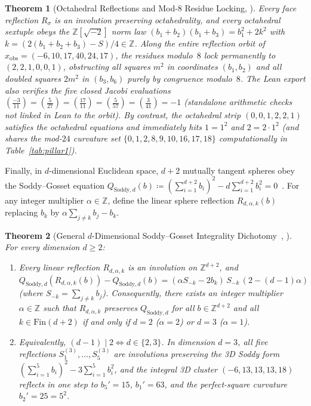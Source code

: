 \documentclass[11pt,reqno]{amsart}
\theoremstyle{plain}
\newtheorem{theorem}{Theorem}[section]
\theoremstyle{definition}
\newcommand{\ZZ}{\mathbb{Z}}
\newcommand{\leg}[2]{\left(\frac{#1}{#2}\right)}
\newcommand{\code}[1]{\texttt{\detokenize{#1}}}
\begin{document}
\begin{theorem}[Octahedral Reflections and Mod-8 Residue Locking, \code{T1d}]
\label{thm:t1d}
Every face reflection $R_\sigma$ is an involution preserving octahedrality, and every octahedral sextuple obeys the $\ZZ[\sqrt{-2}]$ norm law $(b_1+b_2)(b_1+b_3) = b_1^2 + 2 k^2$ with $k = (2(b_1+b_2+b_3) - S)/4 \in \ZZ$. Along the entire reflection orbit of $x_{\mathrm{obs}} = (-6, 10, 17, 40, 24, 17)$, the residues modulo~$8$ lock permanently to $(2, 2, 1, 0, 0, 1)$, obstructing all squares $m^2$ in coordinates $(b_1, b_2)$ and all doubled squares $2m^2$ in $(b_3, b_6)$ purely by congruence modulo~$8$. The Lean export also verifies the five closed Jacobi evaluations $\leg{-3}{11} = \leg{5}{27} = \leg{17}{11} = \leg{5}{57} = \leg{3}{41} = -1$ (standalone arithmetic checks not linked in Lean to the orbit). By contrast, the octahedral strip $(0, 0, 1, 2, 2, 1)$ satisfies the octahedral equations and immediately hits $1 = 1^2$ and $2 = 2\cdot 1^2$ (and shares the mod-$24$ curvature set $\{0,1,2,8,9,10,16,17,18\}$ computationally in Table~\ref{tab:pillar1}).
\end{theorem}

Finally, in $d$-dimensional Euclidean space, $d+2$ mutually tangent spheres obey the Soddy--Gosset equation $Q_{\mathrm{Soddy},d}(b) \coloneqq (\sum_{i=1}^{d+2} b_i)^2 - d \sum_{i=1}^{d+2} b_i^2 = 0$~\cite{lmw2002}. For any integer multiplier $\alpha \in \ZZ$, define the linear sphere reflection $R_{d,\alpha,k}(b)$ replacing $b_k$ by $\alpha\sum_{j\neq k} b_j - b_k$.

\begin{theorem}[General $d$-Dimensional Soddy--Gosset Integrality Dichotomy~\cite{lmw2002}, \code{T1e}]
\label{thm:t1e}
For every dimension $d \ge 2$:
\begin{enumerate}[leftmargin=1.8em, itemsep=1pt]
  \item Every linear reflection $R_{d,\alpha,k}$ is an involution on $\ZZ^{d+2}$, and $Q_{\mathrm{Soddy},d}(R_{d,\alpha,k}(b)) - Q_{\mathrm{Soddy},d}(b) = (\alpha S_{-k} - 2 b_k)\, S_{-k}\, (2 - (d-1)\alpha)$ (where $S_{-k} = \sum_{j\neq k} b_j$). Consequently, there exists an integer multiplier $\alpha \in \ZZ$ such that $R_{d,\alpha,k}$ preserves $Q_{\mathrm{Soddy},d}$ for all $b \in \ZZ^{d+2}$ and all $k \in \mathrm{Fin}(d+2)$ \emph{if and only if} $d = 2$ ($\alpha = 2$) or $d = 3$ ($\alpha = 1$).
  \item Equivalently, $(d-1)\mid 2 \iff d \in \{2,3\}$. In dimension $d = 3$, all five reflections $S^{(3)}_1, \dots, S^{(3)}_5$ are involutions preserving the 3D Soddy form $(\sum_{i=1}^5 b_i)^2 - 3\sum_{i=1}^5 b_i^2$, and the integral 3D cluster $(-6, 13, 13, 13, 18)$ reflects in one step to $b_5'=15$, $b_1'=63$, and the perfect-square curvature $b_2' = 25 = 5^2$.
\end{enumerate}
\end{theorem}
\end{document}
